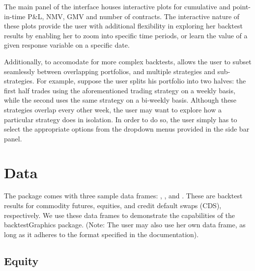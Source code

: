 \documentclass[article]{jss}
\begin{document}
\noindent
The main panel of the  interface houses interactive plots for cumulative and point-in-time P\&L, NMV, GMV and number of contracts. The interactive nature of these plots provide the user with additional flexibility in exploring her backtest results by enabling her to zoom into specific time periods, or learn the value of a given response variable on a specific date.



\noindent
Additionally, to accomodate for more complex backtests,  allows the user to subset seamlessly between overlapping portfolios, and multiple strategies and sub-strategies. For example, suppose the user splits his portfolio into two halves: the first half trades using the aforementioned trading strategy on a weekly basis, while the second uses the same strategy on a bi-weekly basis. Although these strategies overlap every other week, the user may want to explore how a particular strategy does in isolation. In order to do so, the user simply has to select the appropriate options from the dropdown menus provided in the side bar panel.  





\section{Data} \label{sec:data}

The package comes with three sample data frames: , , and . These are backtest results for commodity futures, equities, and credit default swaps (CDS), respectively. We use these data frames to demonstrate the capabilities of the backtestGraphics package. (Note: The user may also use her own data frame, as long as it adheres to the format specified in the documentation).

\subsection{Equity}
\end{document}
